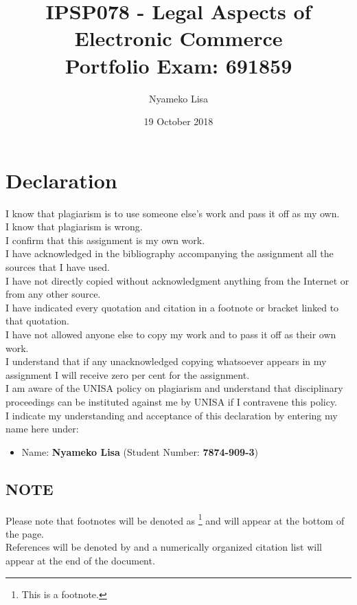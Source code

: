 \documentclass[11pt]{article}
\author{Nyameko Lisa}
\date{19 October 2018}
\title{IPSP078 - Legal Aspects of Electronic Commerce\\\medskip
\large Portfolio Exam: 691859}
\begin{document}
\maketitle
\addvspace{110pt}

\justifying
\addvspace{110pt}
\section*{Declaration}
\label{sec:org7bff506}
I know that plagiarism is to use someone else’s work and pass it off as my own.\\
I know that plagiarism is wrong.\\
I confirm that this assignment is my own work.\\
I have acknowledged in the bibliography accompanying the assignment all the sources that I have used.\\
I have not directly copied without acknowledgment anything from the Internet or from any other source.\\
I have indicated every quotation and citation in a footnote or bracket linked to that quotation.\\
I have not allowed anyone else to copy my work and to pass it off as their own work.\\
I understand that if any unacknowledged copying whatsoever appears in my assignment I will receive zero per cent for the assignment.\\
I am aware of the UNISA policy on plagiarism and understand that disciplinary proceedings can be instituted against me by UNISA if I contravene this policy.\\
I indicate my understanding and acceptance of this declaration by
entering my name here under:
\begin{itemize}
\item Name: \textbf{Nyameko Lisa} (Student Number: \textbf{7874-909-3})
\end{itemize}

\subsection*{NOTE}
\label{sec:org1cfa8e9}
Please note that footnotes will be denoted as \footnote{This is a footnote.} and will
appear at the bottom of the page.\\
References will be denoted by \cite{rsa02_elect_comm_trans_act} and a numerically
organized citation list will appear at the end of the document.
\newpage
\end{document}
